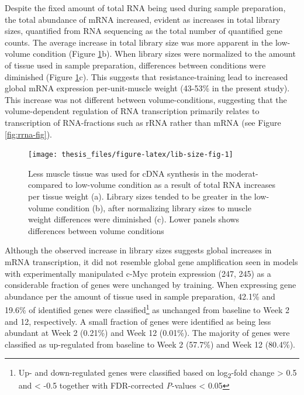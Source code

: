 \documentclass[twoside,10pt]{gihclass} %
\begin{document}
Despite the fixed amount of total RNA being used during sample preparation, the total abundance of mRNA increased, evident as increases in total library sizes, quantified from RNA sequencing as the total number of quantified gene counts. The average increase in total library size was more apparent in the low-volume condition
(Figure \ref{fig:lib-size-fig}b).
When library sizes were normalized to the amount of tissue used in sample preparation, differences between conditions were diminished
(Figure \ref{fig:lib-size-fig}c).
This suggests that resistance-training lead to increased global mRNA expression per-unit-muscle weight (43-53\% in the present study). This increase was not different between volume-conditions, suggesting that the volume-dependent regulation of RNA transcription primarily relates to transcription of RNA-fractions such as rRNA rather than mRNA (see Figure \ref{fig:rrna-fig}).
\begin{figure}

{\centering \texttt{[image: thesis\_files/figure-latex/lib-size-fig-1]} 

}

\caption[Muscle weight and RNA-seq library size]{Less muscle tissue was used for cDNA synthesis in the moderat- compared to low-volume condition as a result of total RNA increases per tissue weight (a). Library sizes tended to be greater in the low-volume condition (b), after normalizing library sizes to muscle weight differences were diminished (c). Lower panels shows differences between volume conditions}\label{fig:lib-size-fig}
\end{figure}
Although the observed increase in library sizes suggests global increases in mRNA transcription, it did not resemble global gene amplification seen in models with experimentally manipulated c-Myc protein expression
(247, 245)
as a considerable fraction of genes were unchanged by training.
When expressing gene abundance per the amount of tissue used in sample preparation, 42.1\% and 19.6\% of identified genes were classified\footnote{Up- and down-regulated genes were classified based on log\textsubscript{2}-fold change \textgreater{} 0.5 and \textless{} -0.5 together with FDR-corrected \emph{P}-values \textless{} 0.05} as unchanged from baseline to Week 2 and 12, respectively. A small fraction of genes were identified as being less abundant at Week 2 (0.21\%) and Week 12 (0.01\%). The majority of genes were classified as up-regulated from baseline to Week 2 (57.7\%) and Week 12 (80.4\%).
\end{document}
